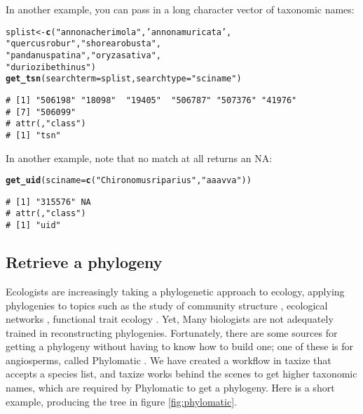 \documentclass[10pt,a4paper,twocolumn]{article}\usepackage[]{graphicx}\usepackage[]{color}
\makeatletter
\newcommand{\hlstr}[1]{\textcolor[rgb]{0.192,0.494,0.8}{#1}}%
\newcommand{\hlstd}[1]{\textcolor[rgb]{0.345,0.345,0.345}{#1}}%
\newcommand{\hlkwb}[1]{\textcolor[rgb]{0.69,0.353,0.396}{#1}}%
\newcommand{\hlkwc}[1]{\textcolor[rgb]{0.333,0.667,0.333}{#1}}%
\newcommand{\hlkwd}[1]{\textcolor[rgb]{0.737,0.353,0.396}{\textbf{#1}}}%
\newenvironment{kframe}{%
 \def\at@end@of@kframe{}%
 \ifinner\ifhmode%
  \def\at@end@of@kframe{\end{minipage}}%
  \begin{minipage}{\columnwidth}%
 \fi\fi%
 \def\FrameCommand##1{\hskip\@totalleftmargin \hskip-\fboxsep
 \colorbox{shadecolor}{##1}\hskip-\fboxsep
     \hskip-\linewidth \hskip-\@totalleftmargin \hskip\columnwidth}%
 \MakeFramed {\advance\hsize-\width
   \@totalleftmargin\z@ \linewidth\hsize
   \@setminipage}}%
 {\par\unskip\endMakeFramed%
 \at@end@of@kframe}
\newenvironment{knitrout}{}{} %
\makeatother
\begin{document}
In another example, you can pass in a long character vector of taxonomic names:

\begin{knitrout}\scriptsize
{}\color{fgcolor}\begin{kframe}
\begin{alltt}
\hlstd{splist} \hlkwb{<-} \hlkwd{c}\hlstd{(}\hlstr{"annona cherimola"}\hlstd{,} \hlstr{'annona muricata'}\hlstd{,}
            \hlstr{"quercus robur"}\hlstd{,} \hlstr{"shorea robusta"}\hlstd{,}
            \hlstr{"pandanus patina"}\hlstd{,} \hlstr{"oryza sativa"}\hlstd{,}
            \hlstr{"durio zibethinus"}\hlstd{)}
\hlkwd{get_tsn}\hlstd{(}\hlkwc{searchterm} \hlstd{= splist,} \hlkwc{searchtype} \hlstd{=} \hlstr{"sciname"}\hlstd{)}
\end{alltt}
\begin{verbatim}
# [1] "506198" "18098"  "19405"  "506787" "507376" "41976" 
# [7] "506099"
# attr(,"class")
# [1] "tsn"
\end{verbatim}
\end{kframe}
\end{knitrout}


In another example, note that no match at all returns an NA:

\begin{knitrout}\scriptsize
{}\color{fgcolor}\begin{kframe}
\begin{alltt}
\hlkwd{get_uid}\hlstd{(}\hlkwc{sciname} \hlstd{=} \hlkwd{c}\hlstd{(}\hlstr{"Chironomus riparius"}\hlstd{,} \hlstr{"aaa vva"}\hlstd{))}
\end{alltt}
\begin{verbatim}
# [1] "315576" NA      
# attr(,"class")
# [1] "uid"
\end{verbatim}
\end{kframe}
\end{knitrout}


\subsection*{Retrieve a phylogeny}
Ecologists are increasingly taking a phylogenetic approach to ecology, applying phylogenies to topics such as the study of community structure \cite{webb2002phylogenies}, ecological networks \cite{rafferty2013phylogenetic}, functional trait ecology \cite{poff2006functional}. Yet, Many biologists are not adequately trained in reconstructing phylogenies. Fortunately, there are some sources for getting a phylogeny without having to know how to build one; one of these is for angiosperms, called Phylomatic \cite{webb2005}. We have created a workflow in taxize that accepts a species list, and taxize works behind the scenes to get higher taxonomic names, which are required by Phylomatic to get a phylogeny. Here is a short example, producing the tree in figure \ref{fig:phylomatic}.
\end{document}

